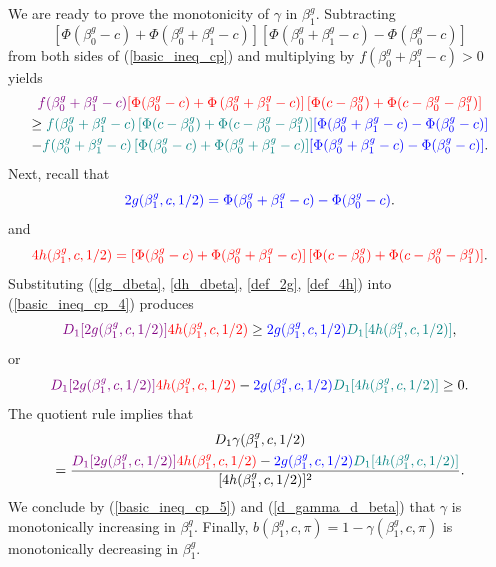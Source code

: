 \documentclass[12pt]{article}
\begin{document}
\begin{appendices}
We are ready to prove the monotonicity of $\gamma$ in $\beta^g_1$. Subtracting $$\left[\Phi(\beta_0^g - c) + \Phi(\beta^g_0 + \beta^g_1 - c) \right]\left[\Phi(\beta_0^g + \beta_1^g - c) - \Phi(\beta_0^g - c)\right]$$ from both sides of (\ref{basic_ineq_cp}) and multiplying by $f(\beta^g_0 + \beta^g_1 - c) > 0$ yields
\begin{multline}\label{basic_ineq_cp_4}
\textcolor{violet}{f(\beta^g_0 + \beta^g_1 - c)} \textcolor{red}{ \left[\Phi(\beta^g_0 - c) + \Phi\left(\beta^g_0 + \beta^g_1 - c \right) \right] \left[ \Phi(c - \beta^g_0) + \Phi(c - \beta^g_0 - \beta^g_1) \right]}  \\ \geq \textcolor{teal}{f(\beta^g_0 + \beta^g_1 - c) \left[\Phi(c - \beta^g_0) + \Phi(c - \beta_0^g - \beta_1^g)\right]}\textcolor{blue}{\left[\Phi(\beta_0^g + \beta_1^g - c) - \Phi(\beta_0^g - c)\right]} \\ -\textcolor{teal}{f(\beta^g_0 + \beta^g_1 - c)   \left[\Phi(\beta_0^g - c) + \Phi(\beta^g_0 + \beta^g_1 - c) \right]} \textcolor{blue}{\left[\Phi(\beta_0^g + \beta_1^g - c) - \Phi(\beta_0^g - c)\right]}.
\end{multline}
Next, recall that
\begin{equation}\label{def_2g}
\textcolor{blue}{2g(\beta^g_1,c,1/2) = \Phi(\beta^g_0 + \beta^g_1 - c) - \Phi(\beta^g_0 - c)}.
\end{equation}
and
\begin{equation}\label{def_4h}
\textcolor{red}{4h(\beta^g_1, c, 1/2) = \left[ \Phi(\beta^g_0 - c) + \Phi(\beta^g_0 + \beta^g_1 - c) \right] \left[\Phi(c - \beta^g_0) + \Phi( c - \beta^g_0 - \beta^g_1) \right]}.
\end{equation}
Substituting (\ref{dg_dbeta}, \ref{dh_dbeta}, \ref{def_2g}, \ref{def_4h}) into (\ref{basic_ineq_cp_4}) produces
\begin{equation*}
\textcolor{violet}{D_1[2g(\beta^g_1, c, 1/2)]}\textcolor{red}{4h(\beta^g_1, c, 1/2)} \geq \textcolor{blue}{2g(\beta^g_1, c, 1/2)}\textcolor{teal}{D_1[4h(\beta^g_1, c, 1/2)]},
\end{equation*}
or 
\begin{equation}\label{basic_ineq_cp_5}
\textcolor{violet}{D_1[2g(\beta^g_1, c, 1/2)]}\textcolor{red}{4h(\beta^g_1, c, 1/2)} - \textcolor{blue}{2g(\beta^g_1, c, 1/2)}\textcolor{teal}{D_1[4h(\beta^g_1, c, 1/2)]} \geq 0.
\end{equation}
The quotient rule implies that
\begin{multline}\label{d_gamma_d_beta}
D_1 \gamma(\beta^g_1, c, 1/2) \\ = \frac{ \textcolor{violet}{D_1[2g(\beta^g_1, c, 1/2)]}\textcolor{red}{4h(\beta^g_1, c, 1/2)} - \textcolor{blue}{2g(\beta^g_1, c, 1/2)}\textcolor{teal}{D_1[4h(\beta^g_1, c, 1/2)]} }{[4h(\beta^g_1, c, 1/2)]^2}.
\end{multline}
We conclude by (\ref{basic_ineq_cp_5}) and (\ref{d_gamma_d_beta}) that $\gamma$ is monotonically increasing in $\beta^g_1$. Finally, $b(\beta^g_1, c, \pi) = 1 - \gamma(\beta^g_1, c, \pi)$ is monotonically decreasing in $\beta^g_1$.


\end{appendices}
\end{document}
